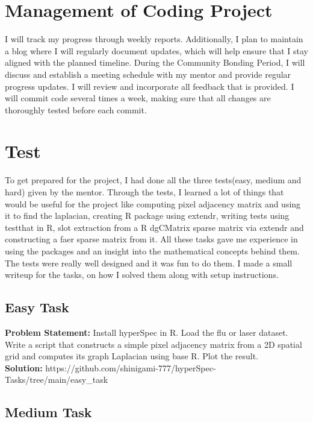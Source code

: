 \documentclass[11pt]{article}
\begin{document}
    \hypertarget{management-of-coding-project}{%
\section{Management of Coding
Project}\label{management-of-coding-project}}

I will track my progress through weekly reports. Additionally, I plan to
maintain a blog where I will regularly document updates, which will help
ensure that I stay aligned with the planned timeline. During the
Community Bonding Period, I will discuss and establish a meeting
schedule with my mentor and provide regular progress updates. I will
review and incorporate all feedback that is provided. I will commit code
several times a week, making sure that all changes are thoroughly tested
before each commit.

    \hypertarget{test}{%
\section{Test}\label{test}}

To get prepared for the project, I had done all the three tests(easy,
medium and hard) given by the mentor. Through the tests, I learned a lot
of things that would be useful for the project like computing pixel
adjacency matrix and using it to find the laplacian, creating R package
using extendr, writing tests using testthat in R, slot extraction from a
R dgCMatrix sparse matrix via extendr and constructing a faer sparse
matrix from it. All these tasks gave me experience in using the packages
and an insight into the mathematical concepts behind them. The tests
were really well designed and it was fun to do them. I made a small
writeup for the tasks, on how I solved them along with setup
instructions.

\hypertarget{easy-task}{%
\subsection{Easy Task}\label{easy-task}}

\textbf{Problem Statement:} Install hyperSpec in R. Load the flu or
laser dataset. Write a script that constructs a simple pixel adjacency
matrix from a 2D spatial grid and computes its graph Laplacian using
base R. Plot the result.\\
\textbf{Solution:}
https://github.com/shinigami-777/hyperSpec-Tasks/tree/main/easy\_task

\hypertarget{medium-task}{%
\subsection{Medium Task}\label{medium-task}}
\end{document}

